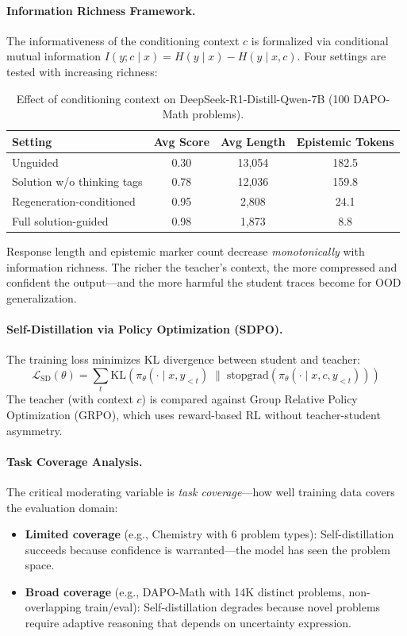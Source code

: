 \documentclass[11pt]{article}
\begin{document}
\paragraph{Information Richness Framework.}
The informativeness of the conditioning context $c$ is formalized via conditional mutual information $I(y; c \mid x) = H(y \mid x) - H(y \mid x, c)$. Four settings are tested with increasing richness:

\begin{table}[h]
\centering
\caption{Effect of conditioning context on DeepSeek-R1-Distill-Qwen-7B (100 DAPO-Math problems).}
\begin{tabular}{lccc}
\toprule
\textbf{Setting} & \textbf{Avg Score} & \textbf{Avg Length} & \textbf{Epistemic Tokens} \\
\midrule
Unguided & 0.30 & 13,054 & 182.5 \\
Solution w/o thinking tags & 0.78 & 12,036 & 159.8 \\
Regeneration-conditioned & 0.95 & 2,808 & 24.1 \\
Full solution-guided & 0.98 & 1,873 & 8.8 \\
\bottomrule
\end{tabular}
\end{table}

Response length and epistemic marker count decrease \textit{monotonically} with information richness. The richer the teacher's context, the more compressed and confident the output---and the more harmful the student traces become for OOD generalization.

\paragraph{Self-Distillation via Policy Optimization (SDPO).}
The training loss minimizes KL divergence between student and teacher:
\begin{equation}
\mathcal{L}_{\mathrm{SD}}(\theta) = \sum_t \mathrm{KL}\!\left(\pi_\theta(\cdot \mid x, y_{<t}) \;\|\; \mathrm{stopgrad}\!\left(\pi_\theta(\cdot \mid x, c, y_{<t})\right)\right)
\end{equation}
The teacher (with context $c$) is compared against Group Relative Policy Optimization (GRPO), which uses reward-based RL without teacher-student asymmetry.

\paragraph{Task Coverage Analysis.}
The critical moderating variable is \textit{task coverage}---how well training data covers the evaluation domain:
\begin{itemize}
    \item \textbf{Limited coverage} (e.g., Chemistry with 6 problem types): Self-distillation succeeds because confidence is warranted---the model has seen the problem space.
    \item \textbf{Broad coverage} (e.g., DAPO-Math with 14K distinct problems, non-overlapping train/eval): Self-distillation degrades because novel problems require adaptive reasoning that depends on uncertainty expression.
\end{itemize}
\end{document}
